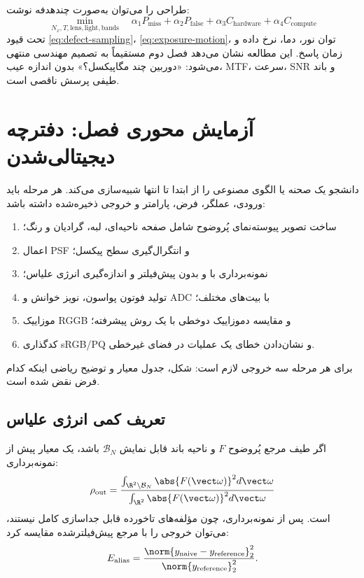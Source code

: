 طراحی را می‌توان به‌صورت چندهدفه نوشت:
\begin{equation}
\min_{N_x,T,\text{lens},\text{light},\text{bands}}
\quad
\alpha_1 P_{\mathrm{miss}}
+\alpha_2 P_{\mathrm{false}}
+\alpha_3 C_{\mathrm{hardware}}
+\alpha_4 C_{\mathrm{compute}}
\end{equation}
تحت قیود \eqref{eq:defect-sampling}، \eqref{eq:exposure-motion}، توان نور، دما، نرخ داده و زمان پاسخ.
این مطالعه نشان می‌دهد فصل دوم مستقیماً به تصمیم مهندسی منتهی می‌شود: «دوربین چند مگاپیکسل؟»
بدون اندازه عیب، MTF، سرعت، SNR و باند طیفی پرسش ناقصی است.

\section{آزمایش محوری فصل: دفترچه دیجیتالی‌شدن}

\begin{workshopbox}
دانشجو یک صحنه یا الگوی مصنوعی را از ابتدا تا انتها شبیه‌سازی می‌کند. هر مرحله باید ورودی، عملگر،
فرض، پارامتر و خروجی ذخیره‌شده داشته باشد:
\begin{enumerate}
\item ساخت تصویر پیوسته‌نمای پُروضوح شامل صفحه ناحیه‌ای، لبه، گرادیان و رنگ؛
\item اعمال PSF و انتگرال‌گیری سطح پیکسل؛
\item نمونه‌برداری با و بدون پیش‌فیلتر و اندازه‌گیری انرژی علیاس؛
\item تولید فوتون پواسون، نویز خوانش و ADC با بیت‌های مختلف؛
\item موزاییک RGGB و مقایسه دموزاییک دوخطی با یک روش پیشرفته؛
\item کدگذاری sRGB/PQ و نشان‌دادن خطای یک عملیات در فضای غیرخطی.
\end{enumerate}
برای هر مرحله سه خروجی لازم است: شکل، جدول معیار و توضیح ریاضی اینکه کدام فرض نقض شده است.
\end{workshopbox}

\subsection{تعریف کمی انرژی علیاس}

اگر طیف مرجع پُروضوح \(F\) و ناحیه باند قابل نمایش \(\mathcal B_N\) باشد، یک معیار پیش از
نمونه‌برداری:
\begin{equation}
\rho_{\mathrm{out}}=
\frac{\int_{\R^2\setminus\mathcal B_N}\abs{F(\vect\omega)}^2d\vect\omega}
{\int_{\R^2}\abs{F(\vect\omega)}^2d\vect\omega}
\end{equation}
است. پس از نمونه‌برداری، چون مؤلفه‌های تاخورده قابل جداسازی کامل نیستند، می‌توان خروجی را با مرجع
پیش‌فیلترشده مقایسه کرد:
\begin{equation}
E_{\mathrm{alias}}=
\frac{\norm{y_{\mathrm{naive}}-y_{\mathrm{reference}}}_2^2}
{\norm{y_{\mathrm{reference}}}_2^2}.
\end{equation}

